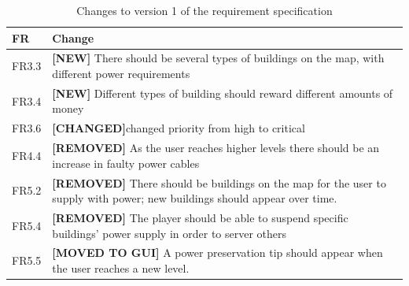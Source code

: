 	\begin{table}
	\begin{tabular}{| p{1.5cm} | p{12cm} |}
		\hline
		\rowcolor{lightgray}
		{\bf FR} & {\bf Change} \\ \hline
		FR3.3 & {\bf \color{green} [NEW]} There should be several types of buildings on the map, 
		with different power requirements  \\ \hline
		FR3.4 & {\bf \color{green} [NEW]} Different types of building should reward different amounts of 
		money \\ \hline
		FR3.6 & {\bf \color{orange} [CHANGED]}changed priority from high to critical \\ \hline
		FR4.4 & {\bf \color{red} [REMOVED]} As the user reaches higher levels there should be an 
		increase in faulty power cables \\ \hline
		FR5.2 & {\bf \color{red} [REMOVED]} There should be buildings on the map for the user to 
		supply with power; new buildings should appear over time. \\ \hline
		FR5.4 & {\bf \color{red} [REMOVED]} The player should be able to suspend specific buildings' 
		power supply in order to server others \\ \hline
		FR5.5 & {\bf \color{orange} [MOVED TO GUI]} A power preservation tip should appear when the 
		user reaches a new level. \\ \hline
	\end{tabular}
	\caption{Changes to version 1 of the requirement specification}
	\end{table}

